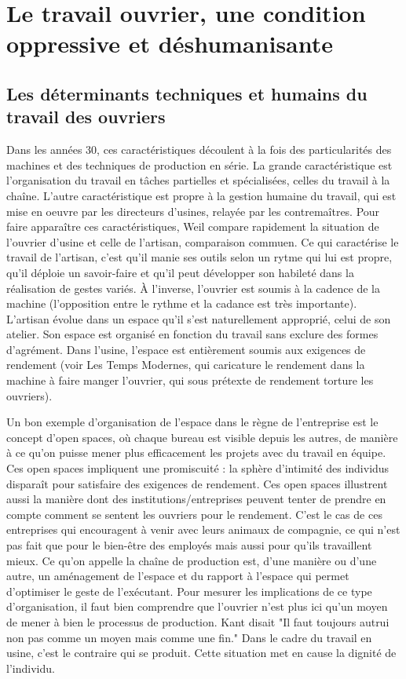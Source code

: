 \documentclass[a4paper,12pt]{book}
\begin{document}
\section{Le travail ouvrier, une condition oppressive et déshumanisante}
\subsection{Les déterminants techniques et humains du travail des ouvriers}
Dans les années 30, ces caractéristiques découlent à la fois des particularités des machines et des techniques de production en série. La grande caractéristique est l'organisation du travail en tâches partielles et spécialisées, celles du travail à la chaîne. L'autre caractéristique est propre à la gestion humaine du travail, qui est mise en oeuvre par les directeurs d'usines, relayée par les contremaîtres. Pour faire apparaître ces caractéristiques, Weil compare rapidement la situation de l'ouvrier d'usine et celle de l'artisan, comparaison commuen. Ce qui caractérise le travail de l'artisan, c'est qu'il manie ses outils selon un rytme qui lui est propre, qu'il déploie un savoir-faire et qu'il peut développer son habileté dans la réalisation de gestes variés. À l'inverse, l'ouvrier est soumis à la cadence de la machine (l'opposition entre le rythme et la cadance est très importante). L'artisan évolue dans un espace qu'il s'est naturellement approprié, celui de son atelier. Son espace est organisé en fonction du travail sans exclure des formes d'agrément. Dans l'usine, l'espace est entièrement soumis aux exigences de rendement (voir Les Temps Modernes, qui caricature le rendement dans la machine à faire manger l'ouvrier, qui sous prétexte de rendement torture les ouvriers).
\par Un bon exemple d'organisation de l'espace dans le règne de l'entreprise est le concept d'open spaces, où chaque bureau est visible depuis les autres, de manière à ce qu'on puisse mener plus efficacement les projets avec du travail en équipe. Ces open spaces impliquent une promiscuité : la sphère d'intimité des individus  disparaît pour satisfaire des exigences de rendement. Ces open spaces illustrent aussi la manière dont des institutions/entreprises peuvent tenter de prendre en compte comment se sentent les ouvriers pour le rendement. C'est le cas de ces entreprises qui encouragent à venir avec leurs animaux de compagnie, ce qui n'est pas fait que pour le bien-être des employés mais aussi pour qu'ils travaillent mieux. Ce qu'on appelle la chaîne de production est, d'une manière ou d'une autre, un aménagement de l'espace et du rapport à l'espace qui permet d'optimiser le geste de l'exécutant. Pour mesurer les implications de ce type d'organisation, il faut bien comprendre que l'ouvrier n'est plus ici qu'un moyen de mener à bien le processus de production. Kant disait "Il faut toujours autrui non pas comme un moyen mais comme une fin." Dans le cadre du travail en usine, c'est le contraire qui se produit. Cette situation met en cause la dignité de l'individu.
\end{document}
